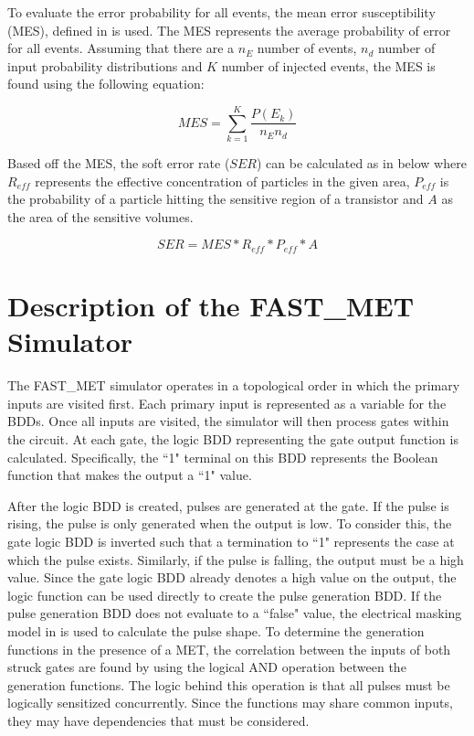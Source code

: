 \documentclass[conference]{IEEEtran}
\begin{document}
To evaluate the error probability for all events, the mean error susceptibility (MES), defined in \cite{METSys} is used. The MES represents the average probability of error for all events. Assuming that there are a $n_E$ number of events, $n_d$ number of input probability distributions and $K$ number of injected events, the MES is found using the following equation:

\begin{equation} \label{MES}
MES = \sum_{k=1}^{K} \frac{P(E_k)}{n_E n_d}
\end{equation}

Based off the MES, the soft error rate ($SER$) can be calculated as in below where $R_{eff}$ represents the effective concentration of particles in the given area, $P_{eff}$ is the probability of a particle hitting the sensitive region of a transistor and $A$ as the area of the sensitive volumes.

\begin{equation} \label{SER}
SER = MES*R_{eff}*P_{eff}*A 
\end{equation}

\section{Description of the FAST\_MET Simulator} \label{desc}

The FAST\_MET simulator operates in a topological order in which the primary inputs are visited first. Each primary input is represented as a variable for the BDDs. Once all inputs are visited, the simulator will then process gates within the circuit. At each gate, the logic BDD representing the gate output function is calculated. Specifically, the ``1" terminal on this BDD represents the Boolean function that makes the output a ``1" value.

After the logic BDD is created, pulses are generated at the gate. If the pulse is rising, the pulse is only generated when the output is low. To consider this, the gate logic BDD is inverted such that a termination to ``1" represents the case at which the pulse exists. Similarly, if the pulse is falling, the output must be a high value. Since the gate logic BDD already denotes a high value on the output, the logic function can be used directly to create the pulse generation BDD. If the pulse generation BDD does not evaluate to a ``false" value, the electrical masking model in \cite{Watkins2016} is used to calculate the pulse shape. To determine the generation functions in the presence of a MET, the correlation between the inputs of both struck gates are found by using the logical AND operation between the generation functions. The logic behind this operation is that all pulses must be logically sensitized concurrently. Since the functions may share common inputs, they may have dependencies that must be considered. 
\end{document}
